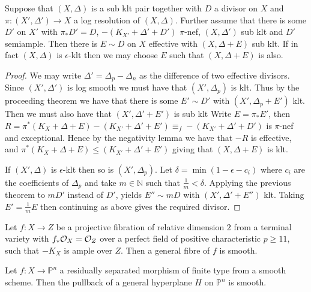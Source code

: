 \begin{corollary}\label{average}
	Suppose that $(X,\Delta)$ is a sub klt pair together with $D$ a divisor on $X$ and $\pi\colon (X',\Delta') \to X$ a log resolution of $(X,\Delta)$. Further assume that there is some $D'$ on $X'$ with $\pi_{*}D'=D$, $-(K_{X'}+\Delta'+D')$ $\pi$-nef, $(X,\Delta')$ sub klt and $D'$ semiample. Then there is $E \sim D$ on $X$ effective with $(X,\Delta+E)$ sub klt. If in fact $(X,\Delta)$ is $\epsilon$-klt then we may choose $E$ such that $(X,\Delta+E)$ is also.
\end{corollary}
\begin{proof}
	We may write $\Delta'=\Delta_{p}-\Delta_{n}$ as the difference of two effective divisors. Since $(X',\Delta')$ is log smooth we must have that $(X',\Delta_{p})$ is klt. Thus by the proceeding theorem we have that there is some $E' \sim D'$ with $(X',\Delta_{p}+E')$ klt. Then we must also have that $(X',\Delta'+E')$ is sub klt 
	Write $E=\pi_{*}E'$, then $R=\pi^{*}(K_{X}+\Delta+E)- (K_{X'}+\Delta'+E')\equiv_{f}-(K_{X'}+\Delta'+D')$ is $\pi$-nef and exceptional. Hence by the negativity lemma we have that $-R$ is effective, and $\pi^{*}(K_{X}+\Delta+E) \leq (K_{X'}+\Delta'+E')$ giving that $(X,\Delta +E)$ is klt.
	
	If $(X',\Delta)$ is $\epsilon$-klt then so is $(X',\Delta_{p})$. Let $\delta =\min (1-\epsilon-c_{i})$ where $c_{i}$ are the coefficients of $\Delta_{p}$ and take $m \in \mathbb{N}$ such that $\frac{1}{m} < \delta$. Applying the previous theorem to $mD'$ instead of $D'$, yields $E'' \sim mD$ with $(X',\Delta'+E'')$ klt. Taking $E'=\frac{1}{m}E$ then continuing as above gives the required divisor. 
\end{proof}


\begin{theorem}\cite[Corollary 1.6]{patakfalvi2017singularities}\label{smoothness}
	Let $f\colon X \to Z$ be a projective fibration of relative dimension $2$ from a terminal variety with $f_{*}\mathcal{O}_{X}=\mathcal{O}_{Z}$ over a perfect field of positive characteristic $p \geq 11$, such that $-K_{X}$ is ample over $Z$. Then a general fibre of $f$ is smooth.
\end{theorem}

\begin{theorem}\cite[Theorem 1]{cumino1986axiomatic}\label{Bertini}
	Let $f\colon X \to \mathbb{P}^{n}$ a residually separated morphism of finite type from a smooth scheme. Then the pullback of a general hyperplane $H$ on $\mathbb{P}^{n}$ is smooth.
\end{theorem}

